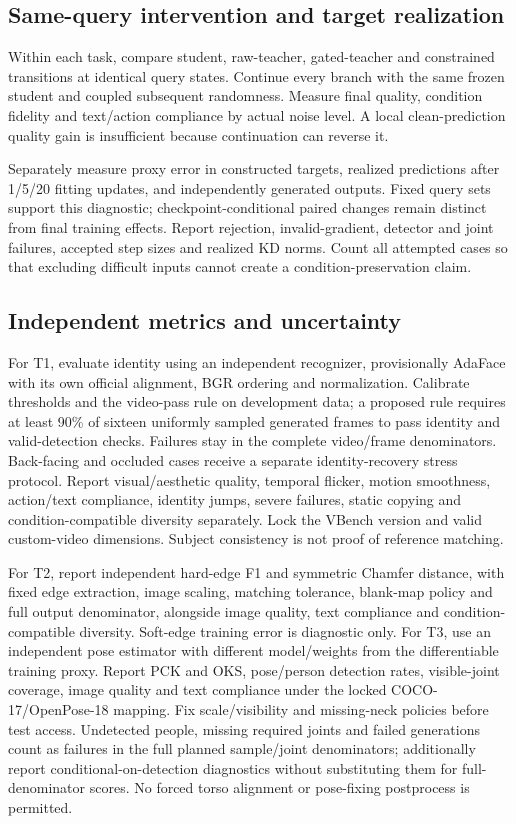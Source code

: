 \documentclass{article}
\begin{document}
\subsection{Same-query intervention and target realization}
Within each task, compare student, raw-teacher, gated-teacher and constrained transitions at identical query states. Continue every branch with the same frozen student and coupled subsequent randomness. Measure final quality, condition fidelity and text/action compliance by actual noise level. A local clean-prediction quality gain is insufficient because continuation can reverse it.

Separately measure proxy error in constructed targets, realized predictions after 1/5/20 fitting updates, and independently generated outputs. Fixed query sets support this diagnostic; checkpoint-conditional paired changes remain distinct from final training effects. Report rejection, invalid-gradient, detector and joint failures, accepted step sizes and realized KD norms. Count all attempted cases so that excluding difficult inputs cannot create a condition-preservation claim.

\subsection{Independent metrics and uncertainty}
For T1, evaluate identity using an independent recognizer, provisionally AdaFace with its own official alignment, BGR ordering and normalization. Calibrate thresholds and the video-pass rule on development data; a proposed rule requires at least 90\% of sixteen uniformly sampled generated frames to pass identity and valid-detection checks. Failures stay in the complete video/frame denominators. Back-facing and occluded cases receive a separate identity-recovery stress protocol. Report visual/aesthetic quality, temporal flicker, motion smoothness, action/text compliance, identity jumps, severe failures, static copying and condition-compatible diversity separately. Lock the VBench version and valid custom-video dimensions. Subject consistency is not proof of reference matching.

For T2, report independent hard-edge F1 and symmetric Chamfer distance, with fixed edge extraction, image scaling, matching tolerance, blank-map policy and full output denominator, alongside image quality, text compliance and condition-compatible diversity. Soft-edge training error is diagnostic only. For T3, use an independent pose estimator with different model/weights from the differentiable training proxy. Report PCK and OKS, pose/person detection rates, visible-joint coverage, image quality and text compliance under the locked COCO-17/OpenPose-18 mapping. Fix scale/visibility and missing-neck policies before test access. Undetected people, missing required joints and failed generations count as failures in the full planned sample/joint denominators; additionally report conditional-on-detection diagnostics without substituting them for full-denominator scores. No forced torso alignment or pose-fixing postprocess is permitted.
\end{document}
